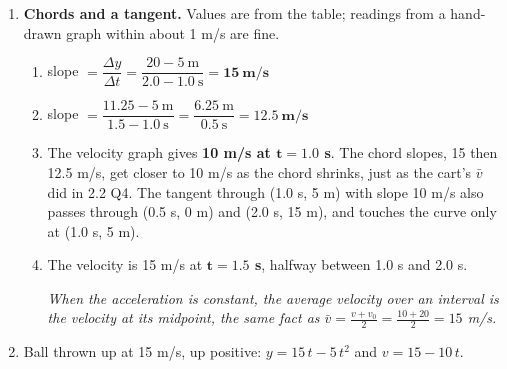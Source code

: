 \documentclass[12pt, twoside]{article}
\begin{document}
\begin{enumerate}[itemsep=0.4cm]
\newpage

\item \textbf{Chords and a tangent.} Values are from the table; readings from a
  hand-drawn graph within about 1 m/s are fine.
  \begin{enumerate}[itemsep=0.3cm]
    \item slope $= \dfrac{\Delta y}{\Delta t} = \dfrac{20 - 5~\text{m}}{2.0 - 1.0~\text{s}}
      = \mathbf{15~\textbf{m/s}}$
    \item slope $= \dfrac{11.25 - 5~\text{m}}{1.5 - 1.0~\text{s}} =
      \dfrac{6.25~\text{m}}{0.5~\text{s}} = \mathbf{12.5~\textbf{m/s}}$
    \item The velocity graph gives \textbf{10 m/s at $\mathbf{t = 1.0}$ s}. The chord
      slopes, 15 then 12.5 m/s, get closer to 10 m/s as the chord shrinks, just as
      the cart's $\bar{v}$ did in 2.2 Q4. The tangent through (1.0 s, 5 m) with slope
      10 m/s also passes through (0.5 s, 0 m) and (2.0 s, 15 m), and touches the
      curve only at (1.0 s, 5 m).
    \item The velocity is 15 m/s at \textbf{$\mathbf{t = 1.5}$ s}, halfway between
      1.0 s and 2.0 s.

      \emph{When the acceleration is constant, the average velocity over an interval
      is the velocity at its midpoint, the same fact as
      $\bar{v} = \frac{v + v_0}{2} = \frac{10 + 20}{2} = 15$ m/s.}
  \end{enumerate}

\item Ball thrown up at 15 m/s, up positive: $y = 15\,t - 5\,t^2$ and
  $v = 15 - 10\,t$.

  \hfill


\end{enumerate}
\end{document}
